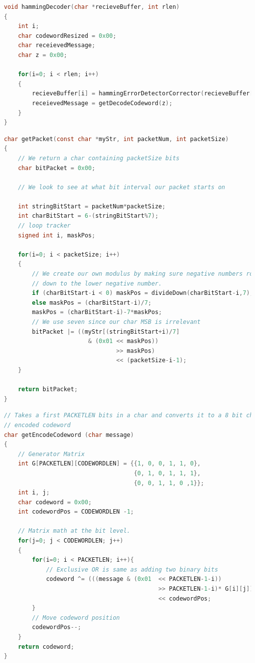 \documentclass[12pt]{article}
\begin{document}
\begin{lstlisting}[language=c, 
caption=Hamming Decoder Function,
label=lst:hamdecoder]
void hammingDecoder(char *recieveBuffer, int rlen)
{
    int i;
    char codewordResized = 0x00;
    char receievedMessage;
    char z = 0x00;

    for(i=0; i < rlen; i++)
    {
        recieveBuffer[i] = hammingErrorDetectorCorrector(recieveBuffer[i]);
        receievedMessage = getDecodeCodeword(z); 
    }
}
\end{lstlisting}

\begin{lstlisting}[language=c, 
caption=Packet Creator (Creates 3-bit Packet Sizes from Characters),
label=lst:getpacket]
char getPacket(const char *myStr, int packetNum, int packetSize)
{
    // We return a char containing packetSize bits
    char bitPacket = 0x00;

    // We look to see at what bit interval our packet starts on

    int stringBitStart = packetNum*packetSize;
    int charBitStart = 6-(stringBitStart%7);
    // loop tracker
    signed int i, maskPos;

    for(i=0; i < packetSize; i++)
    {
        // We create our own modulus by making sure negative numbers round
        // down to the lower negative number.
        if (charBitStart-i < 0) maskPos = divideDown(charBitStart-i,7);
        else maskPos = (charBitStart-i)/7;
        maskPos = (charBitStart-i)-7*maskPos;
        // We use seven since our char MSB is irrelevant
        bitPacket |= ((myStr[(stringBitStart+i)/7]
                        & (0x01 << maskPos))
                                >> maskPos)
                                << (packetSize-i-1);
    }

    return bitPacket;
}
\end{lstlisting}

\begin{lstlisting}[language=c, 
caption=Create codeword from 3-Bit Message,
label=lst:encodercoderword]
// Takes a first PACKETLEN bits in a char and converts it to a 8 bit char
// encoded codeword
char getEncodeCodeword (char message)
{
    // Generator Matrix
    int G[PACKETLEN][CODEWORDLEN] = {{1, 0, 0, 1, 1, 0},
                                     {0, 1, 0, 1, 1, 1},
                                     {0, 0, 1, 1, 0 ,1}};
    int i, j;
    char codeword = 0x00;
    int codewordPos = CODEWORDLEN -1;

    // Matrix math at the bit level.
    for(j=0; j < CODEWORDLEN; j++)
    {
        for(i=0; i < PACKETLEN; i++){
            // Exclusive OR is same as adding two binary bits
            codeword ^= (((message & (0x01  << PACKETLEN-1-i)) 
                                            >> PACKETLEN-1-i)* G[i][j]) 
                                            << codewordPos;
        }
        // Move codeword position
        codewordPos--;
    }
    return codeword;
}
\end{lstlisting}
\end{document}
